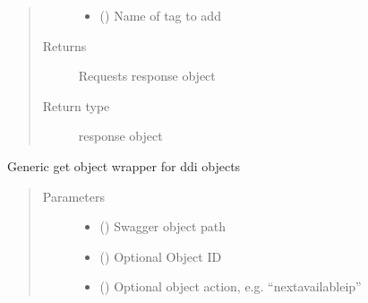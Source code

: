 \documentclass[letterpaper,10pt,english]{sphinxmanual}
\begin{document}
\begin{fulllineitems}
\begin{fulllineitems}
\begin{quote}
\begin{description}
\begin{itemize}
\item {} 
\sphinxAtStartPar
{} () \textendash{} Name of tag to add

\end{itemize}

\item[{Returns}] \leavevmode
\sphinxAtStartPar
Requests response object

\item[{Return type}] \leavevmode
\sphinxAtStartPar
response object

\end{description}\end{quote}

\end{fulllineitems}


\begin{fulllineitems}
\label{\detokenize{b1cdc-class:bloxone.b1cdc.get}}
\sphinxAtStartPar
Generic get object wrapper for ddi objects
\begin{quote}\begin{description}
\item[{Parameters}] \leavevmode\begin{itemize}
\item {} 
\sphinxAtStartPar
{} () \textendash{} Swagger object path

\item {} 
\sphinxAtStartPar
{} () \textendash{} Optional Object ID

\item {} 
\sphinxAtStartPar
{} () \textendash{} Optional object action, e.g. “nextavailableip”

\end{itemize}


\end{description}
\end{quote}
\end{fulllineitems}
\end{fulllineitems}
\end{document}
